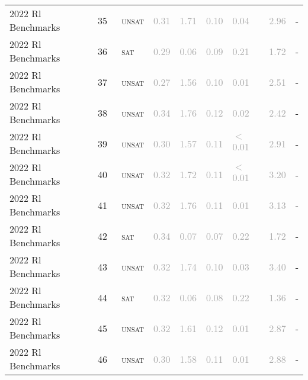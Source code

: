 \begin{center}
{\begin{longtable}{@{}lllllllll@{}}
2022 Rl Benchmarks & 35 & ~\textsc{unsat} & \textcolor{darkgray}{0.31} & \textcolor{darkgray}{1.71} & \textcolor{darkgray}{0.10} & \textcolor{darkgray}{0.04} & \textcolor{darkgray}{2.96} & - \\
2022 Rl Benchmarks & 36 & ~\textsc{sat} & \textcolor{darkgray}{0.29} & \textcolor{darkgray}{0.06} & \textcolor{darkgray}{0.09} & \textcolor{darkgray}{0.21} & \textcolor{darkgray}{1.72} & - \\
2022 Rl Benchmarks & 37 & ~\textsc{unsat} & \textcolor{darkgray}{0.27} & \textcolor{darkgray}{1.56} & \textcolor{darkgray}{0.10} & \textcolor{darkgray}{0.01} & \textcolor{darkgray}{2.51} & - \\
2022 Rl Benchmarks & 38 & ~\textsc{unsat} & \textcolor{darkgray}{0.34} & \textcolor{darkgray}{1.76} & \textcolor{darkgray}{0.12} & \textcolor{darkgray}{0.02} & \textcolor{darkgray}{2.42} & - \\
2022 Rl Benchmarks & 39 & ~\textsc{unsat} & \textcolor{darkgray}{0.30} & \textcolor{darkgray}{1.57} & \textcolor{darkgray}{0.11} & \textcolor{darkgray}{$<$0.01} & \textcolor{darkgray}{2.91} & - \\
2022 Rl Benchmarks & 40 & ~\textsc{unsat} & \textcolor{darkgray}{0.32} & \textcolor{darkgray}{1.72} & \textcolor{darkgray}{0.11} & \textcolor{darkgray}{$<$0.01} & \textcolor{darkgray}{3.20} & - \\
2022 Rl Benchmarks & 41 & ~\textsc{unsat} & \textcolor{darkgray}{0.32} & \textcolor{darkgray}{1.76} & \textcolor{darkgray}{0.11} & \textcolor{darkgray}{0.01} & \textcolor{darkgray}{3.13} & - \\
2022 Rl Benchmarks & 42 & ~\textsc{sat} & \textcolor{darkgray}{0.34} & \textcolor{darkgray}{0.07} & \textcolor{darkgray}{0.07} & \textcolor{darkgray}{0.22} & \textcolor{darkgray}{1.72} & - \\
2022 Rl Benchmarks & 43 & ~\textsc{unsat} & \textcolor{darkgray}{0.32} & \textcolor{darkgray}{1.74} & \textcolor{darkgray}{0.10} & \textcolor{darkgray}{0.03} & \textcolor{darkgray}{3.40} & - \\
2022 Rl Benchmarks & 44 & ~\textsc{sat} & \textcolor{darkgray}{0.32} & \textcolor{darkgray}{0.06} & \textcolor{darkgray}{0.08} & \textcolor{darkgray}{0.22} & \textcolor{darkgray}{1.36} & - \\
2022 Rl Benchmarks & 45 & ~\textsc{unsat} & \textcolor{darkgray}{0.32} & \textcolor{darkgray}{1.61} & \textcolor{darkgray}{0.12} & \textcolor{darkgray}{0.01} & \textcolor{darkgray}{2.87} & - \\
2022 Rl Benchmarks & 46 & ~\textsc{unsat} & \textcolor{darkgray}{0.30} & \textcolor{darkgray}{1.58} & \textcolor{darkgray}{0.11} & \textcolor{darkgray}{0.01} & \textcolor{darkgray}{2.88} & - \\

\end{longtable}}
\end{center}
